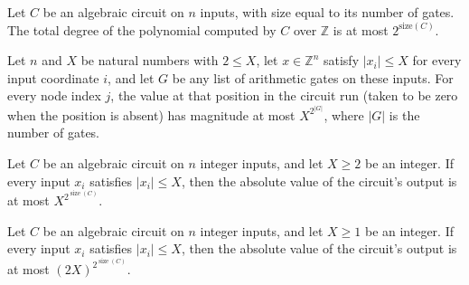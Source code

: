 \begin{theorem}
\label{Randomized.AlgCircuit.totalDegree_toMvPolynomial_le}
\leanok
{}
Let $C$ be an algebraic circuit on $n$ inputs, with size equal to its number of gates.
The total degree of the polynomial computed by $C$ over $\mathbb{Z}$ is at most
$2^{\mathrm{size}(C)}$.
\end{theorem}

\begin{theorem}
\label{Randomized.AlgCircuit.abs_run_le}
\leanok
{}
Let $n$ and $X$ be natural numbers with $2\le X$, let $x\in\mathbb{Z}^n$ satisfy
$|x_i|\le X$ for every input coordinate $i$, and let $G$ be any list of arithmetic gates
on these inputs. For every node index $j$, the value at that position in the circuit run
(taken to be zero when the position is absent) has magnitude at most $X^{2^{|G|}}$,
where $|G|$ is the number of gates.
\end{theorem}

\begin{theorem}
\label{Randomized.AlgCircuit.abs_eval_le_pow}
\leanok
{}
Let $C$ be an algebraic circuit on $n$ integer inputs, and let $X\ge2$ be an integer. If
every input $x_i$ satisfies $|x_i|\le X$, then the absolute value of the circuit's
output is at most $X^{2^{\operatorname{size}(C)}}$.
\end{theorem}

\begin{theorem}
\label{Randomized.AlgCircuit.abs_eval_le}
\leanok
{}
Let $C$ be an algebraic circuit on $n$ integer inputs, and let $X\ge1$ be an integer. If
every input $x_i$ satisfies $|x_i|\le X$, then the absolute value of the circuit's
output is at most $(2X)^{2^{\operatorname{size}(C)}}$.
\end{theorem}


